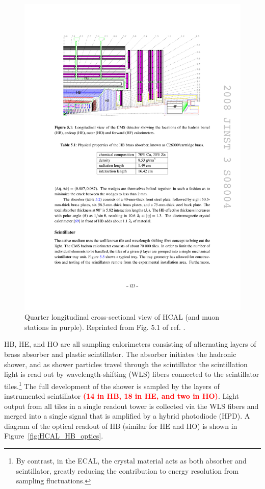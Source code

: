 \documentclass[dissertation.tex]{subfiles}
\begin{document}
\begin{figure}
	\centering
	\includegraphics[scale=1.0]{HCAL_longitudinal_xsec}
	\caption{Quarter longitudinal cross-sectional view of HCAL (and muon stations in purple).  Reprinted from Fig. 5.1 of ref. \cite{CMS_detector_paper}.}
	\label{fig:HCAL_longitudinal_xsec}
\end{figure}

HB, HE, and HO are all sampling calorimeters consisting of alternating layers of brass absorber and plastic scintillator.  The absorber initiates the hadronic shower, and as shower particles travel through the scintillator the scintillation light is read out by wavelength-shifting (WLS) fibers connected to the scintillator tiles.\footnote{By contrast, in the ECAL, the crystal material acts as both absorber and scintillator, greatly reducing the contribution to energy resolution from sampling fluctuations.}  The full development of the shower is sampled by the layers of instrumented scintillator \textcolor{red}{\textbf{(14 in HB, 18 in HE, and two in HO)}}.  Light output from all tiles in a single readout tower is collected via the WLS fibers and merged into a single signal that is amplified by a hybrid photodiode (HPD).  A diagram of the optical readout of HB (similar for HE and HO) is shown in Figure~\ref{fig:HCAL_HB_optics}.
\end{document}
